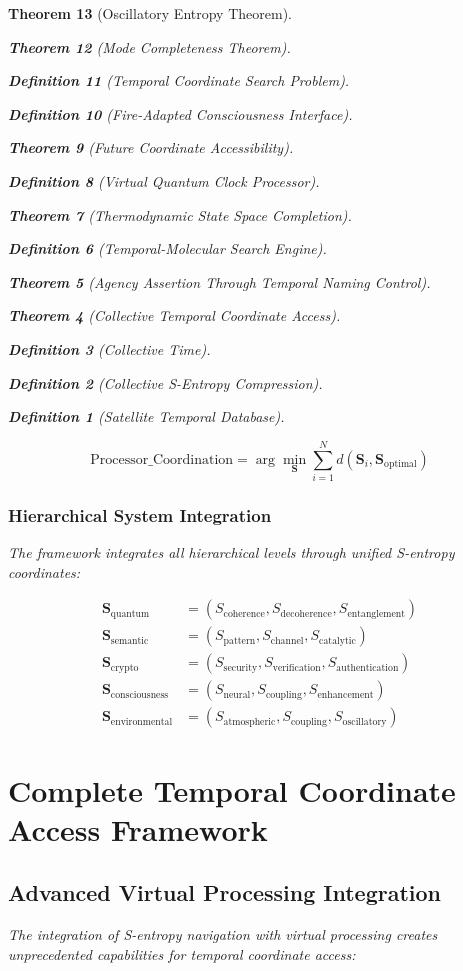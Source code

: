 \documentclass[12pt,a4paper]{article}
\newtheorem{theorem}{Theorem}[section]
\newtheorem{definition}[theorem]{Definition}
\begin{document}
\begin{theorem}[Oscillatory Entropy Theorem]
\begin{theorem}[Mode Completeness Theorem]
\begin{enumerate}
\begin{definition}[Temporal Coordinate Search Problem]
\begin{algorithm}
\begin{definition}[Fire-Adapted Consciousness Interface]
\begin{theorem}[Future Coordinate Accessibility]
\begin{definition}[Virtual Quantum Clock Processor]
\begin{itemize}
\begin{itemize}
\begin{theorem}[Thermodynamic State Space Completion]
\begin{definition}[Temporal-Molecular Search Engine]
\begin{theorem}[Agency Assertion Through Temporal Naming Control]
\begin{remark}
\begin{theorem}[Collective Temporal Coordinate Access]
\begin{definition}[Collective Time]
\begin{definition}[Collective S-Entropy Compression]
\begin{definition}[Satellite Temporal Database]
\begin{algorithm}
\begin{table}[h]
{{\begin{equation}
\text{Processor\_Coordination} = \arg\min_{\mathbf{S}} \sum_{i=1}^{N} d(\mathbf{S}_i, \mathbf{S}_{\text{optimal}})
\end{equation}

\subsubsection{Hierarchical System Integration}

The framework integrates all hierarchical levels through unified S-entropy coordinates:

\begin{align}
\mathbf{S}_{\text{quantum}} &= (S_{\text{coherence}}, S_{\text{decoherence}}, S_{\text{entanglement}}) \\
\mathbf{S}_{\text{semantic}} &= (S_{\text{pattern}}, S_{\text{channel}}, S_{\text{catalytic}}) \\
\mathbf{S}_{\text{crypto}} &= (S_{\text{security}}, S_{\text{verification}}, S_{\text{authentication}}) \\
\mathbf{S}_{\text{consciousness}} &= (S_{\text{neural}}, S_{\text{coupling}}, S_{\text{enhancement}}) \\
\mathbf{S}_{\text{environmental}} &= (S_{\text{atmospheric}}, S_{\text{coupling}}, S_{\text{oscillatory}})
\end{align}

\section{Complete Temporal Coordinate Access Framework}

\subsection{Advanced Virtual Processing Integration}

The integration of S-entropy navigation with virtual processing creates unprecedented capabilities for temporal coordinate access:

}}
\end{table}
\end{algorithm}
\end{definition}
\end{definition}
\end{definition}
\end{theorem}
\end{remark}
\end{theorem}
\end{definition}
\end{theorem}
\end{itemize}
\end{itemize}
\end{definition}
\end{theorem}
\end{definition}
\end{algorithm}
\end{definition}
\end{enumerate}
\end{theorem}
\end{theorem}
\end{document}
